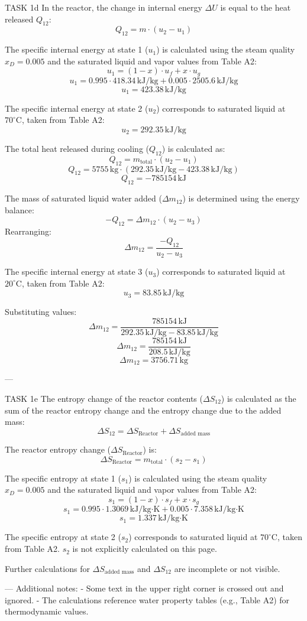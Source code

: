 TASK 1d  
In the reactor, the change in internal energy \( \Delta U \) is equal to the heat released \( Q_{12} \):  
\[
Q_{12} = m \cdot (u_2 - u_1)
\]  

The specific internal energy at state 1 (\( u_1 \)) is calculated using the steam quality \( x_D = 0.005 \) and the saturated liquid and vapor values from Table A2:  
\[
u_1 = (1 - x) \cdot u_f + x \cdot u_g  
\]  
\[
u_1 = 0.995 \cdot 418.34 \, \text{kJ/kg} + 0.005 \cdot 2505.6 \, \text{kJ/kg}  
\]  
\[
u_1 = 423.38 \, \text{kJ/kg}
\]  

The specific internal energy at state 2 (\( u_2 \)) corresponds to saturated liquid at \( 70^\circ \text{C} \), taken from Table A2:  
\[
u_2 = 292.35 \, \text{kJ/kg}
\]  

The total heat released during cooling (\( Q_{12} \)) is calculated as:  
\[
Q_{12} = m_{\text{total}} \cdot (u_2 - u_1)  
\]  
\[
Q_{12} = 5755 \, \text{kg} \cdot (292.35 \, \text{kJ/kg} - 423.38 \, \text{kJ/kg})  
\]  
\[
Q_{12} = -785154 \, \text{kJ}
\]  

The mass of saturated liquid water added (\( \Delta m_{12} \)) is determined using the energy balance:  
\[
-Q_{12} = \Delta m_{12} \cdot (u_2 - u_3)
\]  
Rearranging:  
\[
\Delta m_{12} = \frac{-Q_{12}}{u_2 - u_3}
\]  

The specific internal energy at state 3 (\( u_3 \)) corresponds to saturated liquid at \( 20^\circ \text{C} \), taken from Table A2:  
\[
u_3 = 83.85 \, \text{kJ/kg}
\]  

Substituting values:  
\[
\Delta m_{12} = \frac{785154 \, \text{kJ}}{292.35 \, \text{kJ/kg} - 83.85 \, \text{kJ/kg}}  
\]  
\[
\Delta m_{12} = \frac{785154 \, \text{kJ}}{208.5 \, \text{kJ/kg}}  
\]  
\[
\Delta m_{12} = 3756.71 \, \text{kg}
\]  

---

TASK 1e  
The entropy change of the reactor contents (\( \Delta S_{12} \)) is calculated as the sum of the reactor entropy change and the entropy change due to the added mass:  
\[
\Delta S_{12} = \Delta S_{\text{Reactor}} + \Delta S_{\text{added mass}}
\]  

The reactor entropy change (\( \Delta S_{\text{Reactor}} \)) is:  
\[
\Delta S_{\text{Reactor}} = m_{\text{total}} \cdot (s_2 - s_1)
\]  

The specific entropy at state 1 (\( s_1 \)) is calculated using the steam quality \( x_D = 0.005 \) and the saturated liquid and vapor values from Table A2:  
\[
s_1 = (1 - x) \cdot s_f + x \cdot s_g  
\]  
\[
s_1 = 0.995 \cdot 1.3069 \, \text{kJ/kg·K} + 0.005 \cdot 7.358 \, \text{kJ/kg·K}  
\]  
\[
s_1 = 1.337 \, \text{kJ/kg·K}
\]  

The specific entropy at state 2 (\( s_2 \)) corresponds to saturated liquid at \( 70^\circ \text{C} \), taken from Table A2. \( s_2 \) is not explicitly calculated on this page.  

Further calculations for \( \Delta S_{\text{added mass}} \) and \( \Delta S_{12} \) are incomplete or not visible.  

---  
Additional notes:  
- Some text in the upper right corner is crossed out and ignored.  
- The calculations reference water property tables (e.g., Table A2) for thermodynamic values.